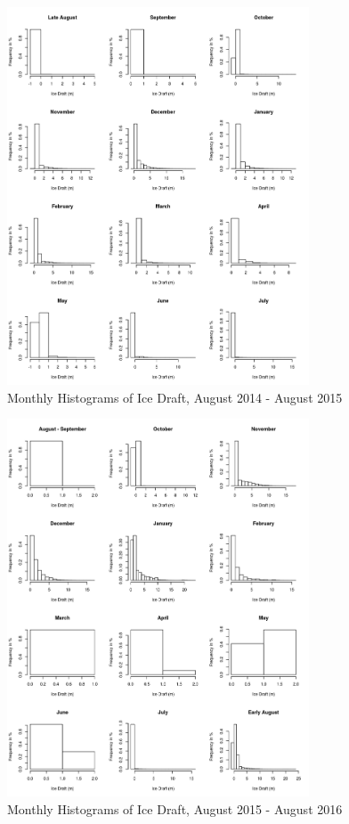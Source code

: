 \documentclass[12pt]{dforeport}
\begin{document}
\begin{figure}  
\centering
\includegraphics[width = 0.8\textwidth]{./figures/65_iceHist_2014_2015.png}
\caption[Histograms of ice draft, 2014-2015]{Monthly Histograms of Ice Draft, August 2014 - August 2015}
\label{f:ih_2014_2015}
\end{figure}

\begin{figure}  
\centering
\includegraphics[width = 0.8\textwidth]{./figures/66_iceHist_2015_2016.png}
\caption[Histograms of ice draft, 2015-2016]{Monthly Histograms of Ice Draft, August 2015 - August 2016}
\label{f:ih_2015_2016}
\end{figure}
\end{document}
